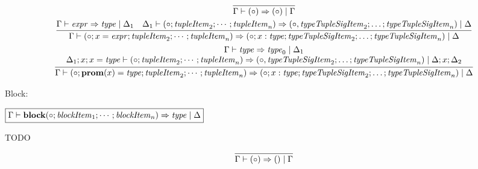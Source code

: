 \begin{gather*}
  \infer{\Gamma \vdash (\circ) \Rightarrow (\circ) \mid \Gamma}{}
  \\
  \infer{\Gamma \vdash (\circ; x = \mathit{expr}; \mathit{tupleItem}_2; \cdots; \mathit{tupleItem}_n) \Rightarrow (\circ; x: \mathit{type}; \mathit{typeTupleSigItem}_2; \ldots; \mathit{typeTupleSigItem}_n) \mid \Delta}{
    \Gamma \vdash \mathit{expr} \Rightarrow \mathit{type} \mid \Delta_1
    &
    \Delta_1 \vdash (\circ; \mathit{tupleItem}_2; \cdots; \mathit{tupleItem}_n) \Rightarrow (\circ, \mathit{typeTupleSigItem}_2; \ldots; \mathit{typeTupleSigItem}_n) \mid \Delta
  }
  \\
  \infer{\Gamma \vdash (\circ; \mathbf{prom}(x) = \mathit{type}; \mathit{tupleItem}_2; \cdots; \mathit{tupleItem}_n) \Rightarrow (\circ; x: \mathit{type}; \mathit{typeTupleSigItem}_2; \ldots; \mathit{typeTupleSigItem}_n) \mid \Delta}{
    \begin{array}{c}
      \Gamma \vdash \mathit{type} \Rightarrow \mathit{type}_0 \mid \Delta_1
      \\
      \Delta_1; x; x = \mathit{type} \vdash (\circ; \mathit{tupleItem}_2; \cdots; \mathit{tupleItem}_n) \Rightarrow (\circ, \mathit{typeTupleSigItem}_2; \ldots; \mathit{typeTupleSigItem}_n) \mid \Delta; x; \Delta_2
    \end{array}
  }
\end{gather*}

Block:

$\fbox{$\Gamma \vdash \mathbf{block}(\circ; \mathit{blockItem}_1; \cdots; \mathit{blockItem}_n) \Rightarrow \mathit{type} \mid \Delta$}$

TODO

\begin{gather*}
  \infer{\Gamma \vdash (\circ) \Rightarrow () \mid \Gamma}{}
\end{gather*}
